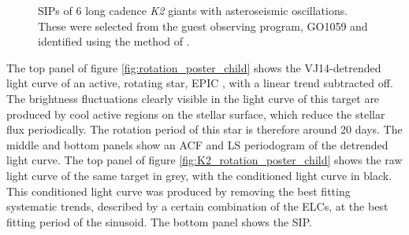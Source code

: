 \begin{figure}
\begin{center}
{        }
    \end{center}
    \caption{SIPs of 6 long cadence {\it K2} giants with asteroseismic
	    oscillations.
	    These were selected from the guest observing program, GO1059 and
	    identified using the method of \citet{Huber2009}.
\label{fig:astero_examples}}
\end{figure}

The top panel of figure \ref{fig:rotation_poster_child} shows the
VJ14-detrended light curve of an active, rotating star, EPIC \rpc, with
a linear trend subtracted off.
The brightness fluctuations clearly visible in the light curve of this target
are produced by cool active regions on the stellar surface, which reduce
the stellar flux periodically.
The rotation period of this star is therefore around 20 days.
The middle and bottom panels show an ACF and LS periodogram of the
detrended light curve.
The top panel of figure \ref{fig:K2_rotation_poster_child} shows the raw light
curve of the same target in grey,  with the conditioned light curve in black.
This conditioned light curve was produced by removing the best fitting
systematic trends, described by a certain combination of the ELCs, at the best
fitting period of the sinusoid.
The bottom panel shows the SIP.

